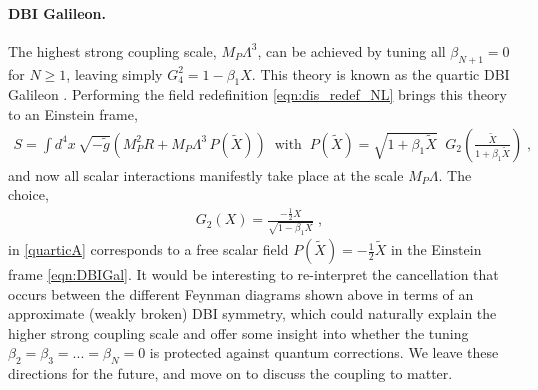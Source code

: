 \documentclass[11pt]{article}
\begin{document}
\paragraph{DBI Galileon.}
The highest strong coupling scale, $M_P \Lambda^3$, can be achieved by tuning all $\beta_{N+1} =0$ for $N \geq 1$, leaving simply $G_{4}^2 = 1 -  \beta_1 X$. 
This theory is known as the quartic DBI Galileon \cite{deRham:2010eu}. 
Performing the field redefinition \eqref{eqn:dis_redef_NL} brings this theory to an Einstein frame, 
\begin{align}
S = \int d^4 x \, \sqrt{-\tilde{g}} \left( M_P^2 R + M_P \Lambda^3 \, P(\tilde{X}) \right) \;\; \text{with} \;\;  P(\tilde{X} ) =  \sqrt{ 1 +  \beta_1 \tilde{X} } \; \; G_2 \left( \frac{ \tilde{X} }{ 1 + \beta_1 \tilde{X}}   \right) \; , 
\label{eqn:DBIGal}
\end{align}
and now all scalar interactions manifestly take place at the scale $M_P \Lambda$. 
The choice,
\begin{align}
 G_2 (X) = \frac{ - \tfrac{1}{2} X}{ \sqrt{ 1  -  \beta_1  X } } \; , 
 \label{eqn:G2_DBI}
\end{align}
in \eqref{quarticA} corresponds to a free scalar field $P(\tilde{X} )= -\tfrac{1}{2} \tilde{X}$ in the Einstein frame \eqref{eqn:DBIGal}.
It would be interesting to re-interpret the cancellation that occurs between the different Feynman diagrams shown above in terms of an approximate (weakly broken) DBI symmetry, which could naturally explain the higher strong coupling scale and offer some insight into whether the tuning $\beta_2 = \beta_3 = ... = \beta_N = 0$ is protected against quantum corrections. We leave these directions for the future, and move on to discuss the coupling to matter. 

\end{document}
